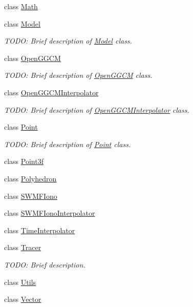 \begin{DoxyCompactItemize}
class \hyperlink{classccmc_1_1_math}{Math}
\item 
class \hyperlink{classccmc_1_1_model}{Model}
\begin{DoxyCompactList}\small\item\em T\-O\-D\-O\-: Brief description of \hyperlink{classccmc_1_1_model}{Model} class. \end{DoxyCompactList}\item 
class \hyperlink{classccmc_1_1_open_g_g_c_m}{Open\-G\-G\-C\-M}
\begin{DoxyCompactList}\small\item\em T\-O\-D\-O\-: Brief description of \hyperlink{classccmc_1_1_open_g_g_c_m}{Open\-G\-G\-C\-M} class. \end{DoxyCompactList}\item 
class \hyperlink{classccmc_1_1_open_g_g_c_m_interpolator}{Open\-G\-G\-C\-M\-Interpolator}
\begin{DoxyCompactList}\small\item\em T\-O\-D\-O\-: Brief description of \hyperlink{classccmc_1_1_open_g_g_c_m_interpolator}{Open\-G\-G\-C\-M\-Interpolator} class. \end{DoxyCompactList}\item 
class \hyperlink{classccmc_1_1_point}{Point}
\begin{DoxyCompactList}\small\item\em T\-O\-D\-O\-: Brief description of \hyperlink{classccmc_1_1_point}{Point} class. \end{DoxyCompactList}\item 
class \hyperlink{classccmc_1_1_point3f}{Point3f}
\item 
class \hyperlink{classccmc_1_1_polyhedron}{Polyhedron}
\item 
class \hyperlink{classccmc_1_1_s_w_m_f_iono}{S\-W\-M\-F\-Iono}
\item 
class \hyperlink{classccmc_1_1_s_w_m_f_iono_interpolator}{S\-W\-M\-F\-Iono\-Interpolator}
\item 
class \hyperlink{classccmc_1_1_time_interpolator}{Time\-Interpolator}
\item 
class \hyperlink{classccmc_1_1_tracer}{Tracer}
\begin{DoxyCompactList}\small\item\em T\-O\-D\-O\-: Brief description. \end{DoxyCompactList}\item 
class \hyperlink{classccmc_1_1_utils}{Utils}
\item 
class \hyperlink{classccmc_1_1_vector}{Vector}
\end{DoxyCompactItemize}
